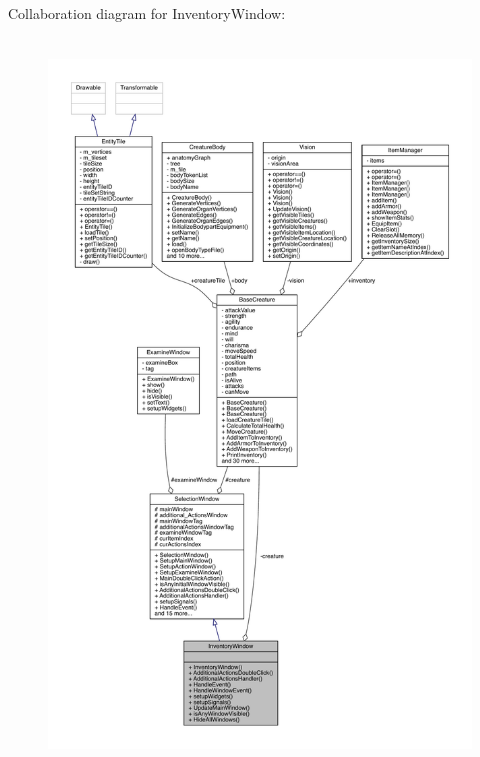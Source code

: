 Collaboration diagram for Inventory\+Window\+:
\nopagebreak
\begin{figure}[H]
\begin{center}
\leavevmode
\includegraphics[height=550pt]{d4/dee/class_inventory_window__coll__graph}
\end{center}
\end{figure}
